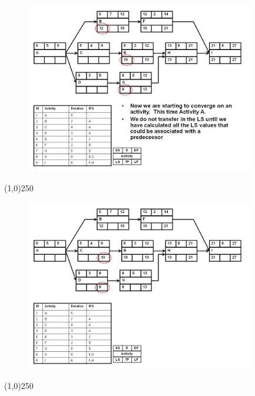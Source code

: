 \begin{frame}
\begin{figure}
	\centering
		\includegraphics[width = 10.0cm]{oldnotes/Slide156.jpg}
\end{figure}
\end{frame}
\begin{center}\line(1,0){250}\end{center}




\begin{frame}
\begin{figure}
	\centering
		\includegraphics[width = 10.0cm]{oldnotes/Slide157.jpg}
\end{figure}
\end{frame}
\begin{center}\line(1,0){250}\end{center}




